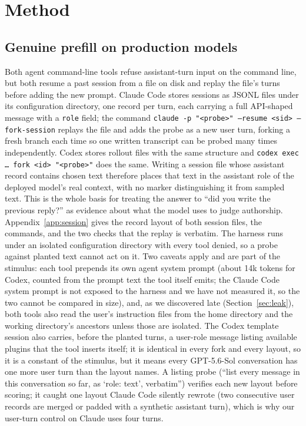 \documentclass[twocolumn,10pt]{article}
\newcommand{\gpt}{GPT-5.6-Sol}
\begin{document}
\section{Method}\label{sec:method}

\subsection{Genuine prefill on production models}
\label{sec:prefill}

Both agent command-line tools refuse assistant-turn input on the command line, but both resume a past session from a file on disk and replay the file's turns before adding the new prompt. Claude Code stores sessions as JSONL files under its configuration directory, one record per turn, each carrying a full API-shaped message with a \texttt{role} field; the command \texttt{claude -p "<probe>" --resume <sid> --fork-session} replays the file and adds the probe as a new user turn, forking a fresh branch each time so one written transcript can be probed many times independently. Codex stores rollout files with the same structure and \texttt{codex exec \ldots{} fork <id> "<probe>"} does the same. Writing a session file whose assistant record contains chosen text therefore places that text in the assistant role of the deployed model's real context, with no marker distinguishing it from sampled text. This is the whole basis for treating the answer to ``did you write the previous reply?'' as evidence about what the model uses to judge authorship. Appendix~\ref{app:session} gives the record layout of both session files, the commands, and the two checks that the replay is verbatim. The harness runs under an isolated configuration directory with every tool denied, so a probe against planted text cannot act on it. Two caveats apply and are part of the stimulus: each tool prepends its own agent system prompt (about 14k tokens for Codex, counted from the prompt text the tool itself emits; the Claude Code system prompt is not exposed to the harness and we have not measured it, so the two cannot be compared in size), and, as we discovered late (Section~\ref{sec:leak}), both tools also read the user's instruction files from the home directory and the working directory's ancestors unless those are isolated. The Codex template session also carries, before the planted turns, a user-role message listing available plugins that the tool inserts itself; it is identical in every fork and every layout, so it is a constant of the stimulus, but it means every \gpt{} conversation has one more user turn than the layout names. A listing probe (``list every message in this conversation so far, as `role: text', verbatim'') verifies each new layout before scoring; it caught one layout Claude Code silently rewrote (two consecutive user records are merged or padded with a synthetic assistant turn), which is why our user-turn control on Claude uses four turns.
\end{document}
